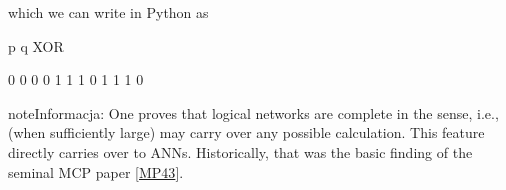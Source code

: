 \documentclass[a4paper,12pt,polish]{jupyterBook}
\begin{document}
\sphinxAtStartPar
which we can write in Python as
\begin{sphinxVerbatimInput}

\begin{sphinxVerbatim}[commandchars=\\\{\}]
   
\end{sphinxVerbatim}
\end{sphinxVerbatimInput}
\begin{sphinxVerbatimInput}

\begin{sphinxVerbatim}[commandchars=\\\{\}]

   \PYG{p}{[}\PYG{p}{]} 
       \PYG{p}{[}\PYG{p}{]} 
\end{sphinxVerbatim}
\end{sphinxVerbatimInput}
\begin{sphinxVerbatimOutput}

\begin{sphinxVerbatim}[commandchars=\\\{\}]
p q XOR

0 0  0
0 1  1
1 0  1
1 1  0
\end{sphinxVerbatim}
\end{sphinxVerbatimOutput}

\begin{sphinxadmonition}{note}{Informacja:}
\sphinxAtStartPar
One proves that logical networks are complete in the  sense, i.e., (when sufficiently large) may carry over any possible calculation. This feature directly carries over to ANNs. Historically, that was the basic finding of the seminal MCP paper {[}\hyperlink{cite.docs/conclusion:id9}{MP43}{]}.
\end{sphinxadmonition}
\end{document}
